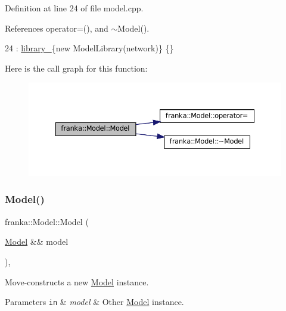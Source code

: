 Definition at line 24 of file model.\+cpp.



References operator=(), and $\sim$\+Model().


\begin{DoxyCode}
24 : \hyperlink{classfranka_1_1Model_a966abbe74240654b093b4d18476ab09b}{library\_}\{\textcolor{keyword}{new} ModelLibrary(network)\} \{\}
\end{DoxyCode}
Here is the call graph for this function\+:
\nopagebreak
\begin{figure}[H]
\begin{center}
\leavevmode
\includegraphics[width=350pt]{classfranka_1_1Model_a751d939935eb51f06dcfd18c6c756ceb_cgraph}
\end{center}
\end{figure}
\mbox{\label{classfranka_1_1Model_a8b58ff37f62512aecdcd0e6aabfd9548}} 
\subsubsection{\texorpdfstring{Model()}{Model()}\hspace{0.1cm}{\footnotesize\ttfamily [2/2]}}
{\footnotesize\ttfamily franka\+::\+Model\+::\+Model (\begin{DoxyParamCaption}\item[{\hyperlink{classfranka_1_1Model}{Model} \&\&}]{model }\end{DoxyParamCaption})\hspace{0.3cm}{\ttfamily [default]}, {\ttfamily [noexcept]}}

Move-\/constructs a new \hyperlink{classfranka_1_1Model}{Model} instance.


\begin{DoxyParams}[1]{Parameters}
\mbox{\tt in}  & {\em model} & Other \hyperlink{classfranka_1_1Model}{Model} instance. \\
\hline
\end{DoxyParams}
\mbox{\label{classfranka_1_1Model_a1d6ffa26afc6cfdff7e329d15b8bd65e}} 
